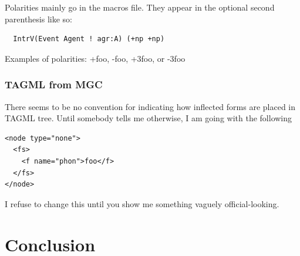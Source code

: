 \documentclass[11pt]{article}
\begin{document}
Polarities mainly go in the macros file.  They appear in the optional
second parenthesis like so:

\begin{verbatim}
  IntrV(Event Agent ! agr:A) (+np +np)
\end{verbatim}

Examples of polarities: +foo, -foo, +3foo, or -3foo

\subsubsection{TAGML from MGC}

There seems to be no convention for indicating how inflected 
forms are placed in TAGML tree.  Until somebody tells me 
otherwise, I am going with the following

\begin{verbatim}
<node type="none">
  <fs>
    <f name="phon">foo</f>
  </fs>
</node>
\end{verbatim}

I refuse to change this until you show me something vaguely
official-looking.


\section{Conclusion}

\end{document}
